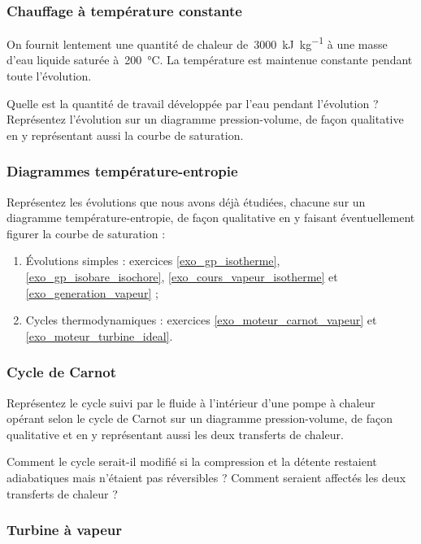 \subsubsection{Chauffage à température constante}
\label{exo_chauffage_isotherme_eau}

	On fournit lentement une quantité de chaleur de~\SI{3000}{\kilo\joule\per\kilogram} à une masse d’eau liquide saturée à~\SI{200}{\degreeCelsius}. La température est maintenue constante pendant toute l’évolution.
	
	Quelle est la quantité de travail développée par l’eau pendant l’évolution ? Représentez l’évolution sur un diagramme pression-volume, de façon qualitative en y représentant aussi la courbe de saturation.


\subsubsection{Diagrammes température-entropie}
\label{exo_diagrammes_ts}

	Représentez les évolutions que nous avons déjà étudiées, chacune sur un diagramme température-entropie, de façon qualitative en y faisant éventuellement figurer la courbe de saturation :
	
	\begin{enumerate}
		\item Évolutions simples : exercices \ref{exo_gp_isotherme}, \ref{exo_gp_isobare_isochore}, \ref{exo_cours_vapeur_isotherme} et \ref{exo_generation_vapeur} ;
		\item Cycles thermodynamiques : exercices \ref{exo_moteur_carnot_vapeur} et \ref{exo_moteur_turbine_ideal}.
	\end{enumerate}

	
\subsubsection{Cycle de Carnot}
\label{exo_ts_carnot}

	Représentez le cycle suivi par le fluide à l’intérieur d’une pompe à chaleur opérant selon le cycle de Carnot sur un diagramme pression-volume, de façon qualitative et en y représentant aussi les deux transferts de chaleur.
	
	Comment le cycle serait-il modifié si la compression et la détente restaient adiabatiques mais n’étaient pas réversibles ? Comment seraient affectés les deux transferts de chaleur ?

\subsubsection{Turbine à vapeur}
\label{exo_turbine_vapeur_isentropique}

